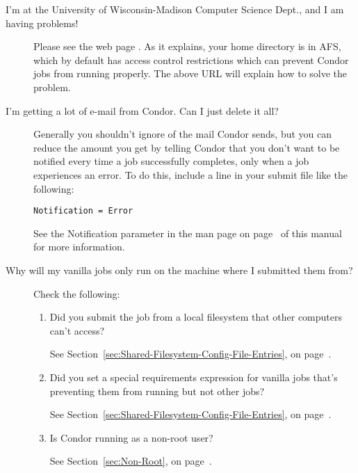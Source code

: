 \begin{description}
\item[I'm at the University of Wisconsin-Madison Computer Science Dept., and I am having problems!]

Please see the web page .
As
it explains, your home directory is in AFS, which by default has
access control restrictions which can prevent Condor jobs from running
properly.
The above URL will explain how to solve the problem.

\item[I'm getting a lot of e-mail from Condor.  Can I just delete it all?]

Generally you shouldn't ignore  of the mail Condor sends,
but you can reduce the amount you get by telling Condor that you don't
want to be notified every time a job successfully completes, only when
a job experiences an error.
To do this, include a line in your submit file like the following:

\begin{verbatim}Notification = Error\end{verbatim}

See the Notification parameter in the  man page on
page~\pageref{man-condor-submit-notification} of this manual for more
information.

\item[Why will my vanilla jobs only run on the machine where I submitted them from?]

Check the following:
\begin {enumerate}

\item{Did you submit the job from a local filesystem that other
computers can't access?}

See Section~\ref{sec:Shared-Filesystem-Config-File-Entries}, on
page~\pageref{sec:Shared-Filesystem-Config-File-Entries}.

\item{Did you set a special requirements expression for 
vanilla jobs that's preventing them from running but not other jobs?}

See Section~\ref{sec:Shared-Filesystem-Config-File-Entries}, on
page~\pageref{sec:Shared-Filesystem-Config-File-Entries}.

\item{Is Condor running as a non-root user?}

See Section~\ref{sec:Non-Root}, on page~\pageref{sec:Non-Root}.


\end{enumerate}
\end{description}
